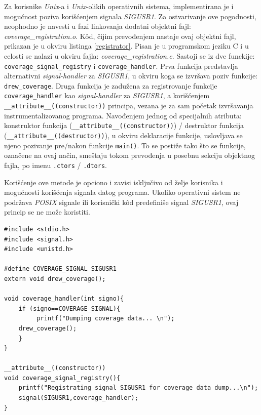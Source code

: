 \documentclass[12pt,oneside]{memoir}
\newcommand{\kod}[1]{\texttt{#1}}
\newcommand{\strano}[1]{\textit{#1}}
\begin{document}
Za korisnike \strano{Unix}-a i \strano{Unix}-olikih operativnih sistema, implementirana je i mogućnost poziva korišćenjem signala \strano{SIGUSR1}. Za ostvarivanje ove pogodnosti, neophodno je navesti u fazi linkovanja dodatni objektni fajl: \strano{coverage\_registration.o}. K\^{o}d, čijim prevođenjem nastaje ovaj objektni fajl, prikazan je u okviru listinga \ref{registrator}. Pisan je u programskom jeziku C i u celosti se nalazi u okviru fajla:  \strano{coverage\_registration.c}. Sastoji se iz dve funckije: \kod{coverage\_signal\_registry} i \kod{coverage\_handler}. Prva funkcija predstavlja alternativni \strano{signal-handler} za \strano{SIGUSR1}, u okviru koga se izvršava poziv funkcije: \kod{drew\_coverage}. Druga funkcija je zadužena za registrovanje funkcije \kod{coverage\_handler} kao \strano{signal-handler} za \strano{SIGUSR1}, a korišćenjem \kod{\_\_attribute\_\_((constructor))} principa, vezana je za sam početak izvršavanja instrumentalizovanog programa. Navođenjem jednog od specijalnih atributa: konstruktor funkcija (\kod{\_\_attribute\_\_((constructor))}) / destruktor funkcija (\kod{\_\_attribute\_\_((destructor))}), u okviru deklaracije funkcije, uslovljava se njeno pozivanje pre/nakon funkcije \kod{main()}. To se postiže tako što se funkcije, označene na ovaj način, smeštaju tokom prevođenja u posebnu sekciju objektnog fajla, po imenu \kod{.ctors} / \kod{.dtors}. 

Korišćenje ove metode je opciono i zavisi isključivo od želje korisnika i mogućnosti korišćenja signala datog programa. Ukoliko operativni sistem ne podržava \strano{POSIX} signale ili korisnički k\^{o}d predefiniše signal \strano{SIGUSR1}, ovaj princip se ne može koristiti.

\begin{lstlisting}[caption={Izvorni k\^{o}d u okviru fajla: \strano{coverage\_registration.c}},frame=single, label=registrator]
#include <stdio.h>                                                       
#include <signal.h>                                                      
#include <unistd.h>     

#define COVERAGE_SIGNAL SIGUSR1
extern void drew_coverage();

void coverage_handler(int signo){
    if (signo==COVERAGE_SIGNAL){
         printf("Dumping coverage data... \n");
    drew_coverage();
    }
}

__attribute__((constructor))
void coverage_signal_registry(){
    printf("Registrating signal SIGUSR1 for coverage data dump...\n");
    signal(SIGUSR1,coverage_handler);
}
\end{lstlisting}
\end{document}
